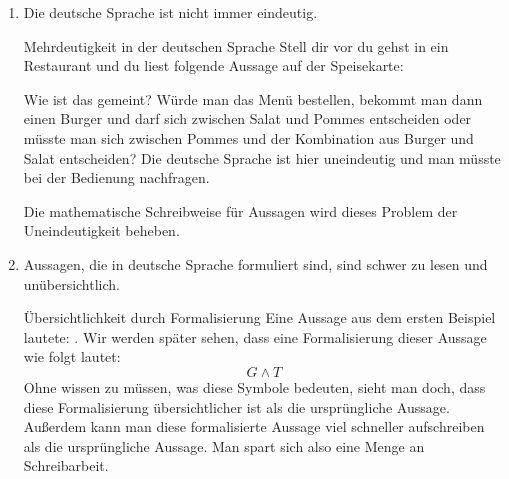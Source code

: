 \documentclass[../../main.tex]{subfiles}
\begin{document}
\begin{enumerate}
    \item Die deutsche Sprache ist nicht immer eindeutig. 
        \begin{example}{Mehrdeutigkeit in der deutschen Sprache}
        Stell dir vor du gehst in ein Restaurant und du liest folgende Aussage auf der
        Speisekarte: 
        
         
         Wie ist das gemeint? Würde man das Menü bestellen, bekommt man dann einen Burger und darf sich zwischen Salat und Pommes entscheiden oder müsste man sich zwischen Pommes und der Kombination aus Burger und Salat entscheiden? Die deutsche Sprache ist hier uneindeutig und man müsste bei der Bedienung nachfragen.
         
        \end{example}
        Die mathematische Schreibweise für Aussagen wird dieses Problem der Uneindeutigkeit beheben.
    \item Aussagen, die in deutsche Sprache formuliert sind, sind schwer zu lesen und unübersichtlich.
    \begin{example}{Übersichtlichkeit durch Formalisierung}
        Eine Aussage aus dem ersten Beispiel lautete: . Wir werden später sehen, dass eine Formalisierung dieser Aussage wie folgt lautet:
        \[ G \land T\]
        Ohne wissen zu müssen, was diese Symbole bedeuten, sieht man doch, dass 
        diese Formalisierung übersichtlicher ist als die ursprüngliche Aussage. 
        Außerdem kann man diese formalisierte Aussage viel schneller 
        aufschreiben als die ursprüngliche Aussage. Man spart sich also eine Menge an Schreibarbeit.
    \end{example}
\end{enumerate}
\end{document}
